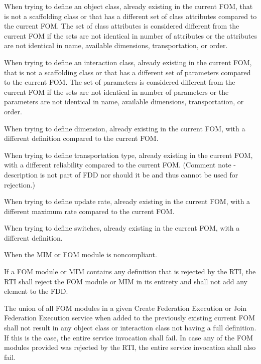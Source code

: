 \begin{stddashlist}
    \item When trying to define an object class, already existing in the current FOM, that is not a scaffolding class or that has a different set of class attributes compared to the current FOM. The set of class attributes is considered different from the current FOM if the sets are not identical in number of attributes or the attributes are not identical in name, available dimensions, transportation, or order.
    \item When trying to define an interaction class, already existing in the current FOM, that is not a scaffolding class or that has a different set of parameters compared to the current FOM. The set of parameters is considered different from the current FOM if the sets are not identical in number of parameters or the parameters are not identical in name, available dimensions, transportation, or order.
    \item When trying to define dimension, already existing in the current FOM, with a different definition compared to the current FOM.
    \item When trying to define transportation type, already existing in the current FOM, with a different reliability compared to the current FOM. (Comment note - description is not part of FDD nor should it be and thus cannot be used for rejection.)
    \item When trying to define update rate, already existing in the current FOM, with a different maximum rate compared to the current FOM.
    \item When trying to define switches, already existing in the current FOM, with a different definition.
    \item When the MIM or FOM module is noncompliant.
\end{stddashlist}

If a FOM module or MIM contains any definition that is rejected by the RTI, the RTI shall reject the FOM module or MIM in its entirety and shall not add any element to the FDD.

The union of all FOM modules in a given Create Federation Execution or Join Federation Execution service when added to the previously existing current FOM shall not result in any object class or interaction class not having a full definition. If this is the case, the entire service invocation shall fail. In case any of the FOM modules provided was rejected by the RTI, the entire service invocation shall also fail.

